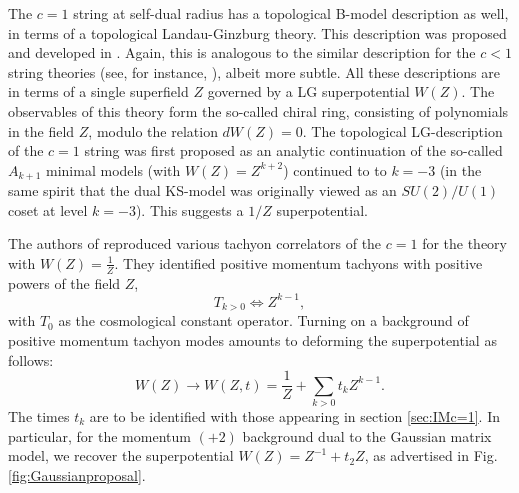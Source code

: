 \documentclass[english]{article}
\begin{document}
The $c=1$ string at self-dual radius has a topological B-model description as well, in terms of a topological Landau-Ginzburg theory. This description was proposed and developed in \cite{ghoshalMukhiLG,ghoshalMukhiIm, hananyOzPlLG}. Again, this is analogous to the similar description for the $c<1$ string theories (see, for instance,  \cite{dijkgraaf1991topological,dijkgraaf1990notes}), albeit more subtle. All these descriptions are in terms of a single superfield $Z$ governed by a LG superpotential $W(Z)$. 
The observables of this theory form the so-called chiral ring, consisting of polynomials in the field $Z$, modulo the relation $dW(Z)=0$. The topological LG-description of the $c=1$ string was first proposed as an analytic continuation of the so-called $A_{k+1}$ minimal models (with $W(Z)=Z^{k+2}$) continued to to $k=-3$ (in the same spirit that the dual KS-model was originally viewed as an $SU(2)/U(1)$ coset at level $k=-3$). This suggests a $1/Z$ superpotential.

The authors of \cite{ghoshalMukhiLG,ghoshalMukhiIm,hananyOzPlLG} reproduced various tachyon correlators of the $c=1$ for the theory with $W(Z)=\frac{1}{Z}$. They identified positive momentum tachyons with positive powers of the field $Z$,
\begin{equation}
    T_{k>0} \Leftrightarrow Z^{k-1},
\end{equation}
with $T_{0}$ as the cosmological constant operator. Turning on a background of positive momentum tachyon modes amounts to deforming the superpotential as follows: 
\begin{equation}
    W(Z) \rightarrow W(Z,t) = \frac{1}{Z} + \sum_{k>0} t_{k} Z^{k-1}.
\end{equation}
The times $t_k$ are to be identified with those appearing in section \ref{sec:IMc=1}. In particular, for the momentum $(+2)$ background dual to the Gaussian matrix model, we recover the superpotential $W(Z)=Z^{-1}+t_{2}Z$, as advertised in Fig.\ref{fig:Gaussianproposal}. 
\end{document}
